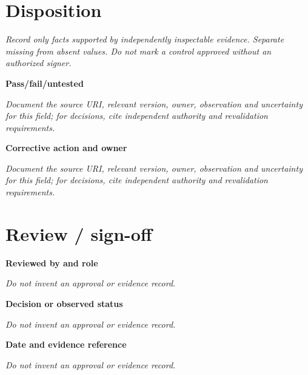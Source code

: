 \documentclass[11pt,letterpaper]{article}
\begin{document}
\section{Disposition}
\noindent\emph{Record only facts supported by independently inspectable evidence. Separate missing from absent values. Do not mark a control approved without an authorized signer.}\par
\noindent\textbf{Pass/fail/untested}\par
\noindent\emph{Document the source URI, relevant version, owner, observation and uncertainty for this field; for decisions, cite independent authority and revalidation requirements.}\par\medskip
\noindent\textbf{Corrective action and owner}\par
\noindent\emph{Document the source URI, relevant version, owner, observation and uncertainty for this field; for decisions, cite independent authority and revalidation requirements.}\par\medskip
\section{Review / sign-off}
\noindent\textbf{Reviewed by and role}\par
\emph{Do not invent an approval or evidence record.}\par\medskip
\noindent\textbf{Decision or observed status}\par
\emph{Do not invent an approval or evidence record.}\par\medskip
\noindent\textbf{Date and evidence reference}\par
\emph{Do not invent an approval or evidence record.}\par\medskip
\end{document}
